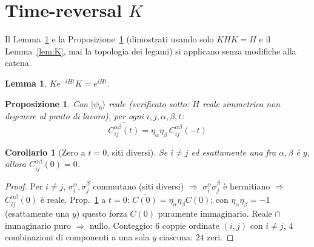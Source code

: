 \documentclass[11pt,a4paper]{article}
\newtheorem{lemma}{Lemma}
\newtheorem{proposizione}{Proposizione}
\newtheorem{corollario}{Corollario}
\begin{document}
\section{Time-reversal \texorpdfstring{$K$}{K}}
\label{sec:K}

Il Lemma~\ref{lem:K-tempo} e la Proposizione~\ref{prop:K-correlatore} (dimostrati usando solo
$KHK=H$ e il Lemma~\ref{lem:K}, mai la topologia dei legami) si applicano senza modifiche alla
catena.

\begin{lemma}
\label{lem:K-tempo}
$Ke^{-iHt}K=e^{iHt}$.
\end{lemma}

\begin{proposizione}
\label{prop:K-correlatore}
Con $|\psi_0\rangle$ reale (verificato sotto: $H$ reale simmetrica non degenere al punto di
lavoro), per ogni $i,j,\alpha,\beta,t$:
\begin{equation}
\boxed{\;\overline{C_{ij}^{\alpha\beta}(t)} = \eta_\alpha\eta_\beta\,C_{ij}^{\alpha\beta}(-t)\;}
\end{equation}
\end{proposizione}

\begin{corollario}[Zero a $t=0$, siti diversi]
\label{cor:zero-t0-diff}
Se $i\neq j$ ed esattamente una fra $\alpha,\beta$ è $y$, allora $C_{ij}^{\alpha\beta}(0)=0$.
\end{corollario}
\begin{proof}
Per $i\neq j$, $\sigma_i^\alpha,\sigma_j^\beta$ commutano (siti diversi) $\Rightarrow$
$\sigma_i^\alpha\sigma_j^\beta$ è hermitiano $\Rightarrow$ $C_{ij}^{\alpha\beta}(0)$ è reale.
Prop.~\ref{prop:K-correlatore} a $t=0$: $\overline{C(0)}=\eta_\alpha\eta_\beta C(0)$; con
$\eta_\alpha\eta_\beta=-1$ (esattamente una $y$) questo forza $C(0)$ puramente immaginario.
Reale $\cap$ immaginario puro $\Rightarrow$ nullo. Conteggio: $6$ coppie ordinate $(i,j)$ con
$i\neq j$, $4$ combinazioni di componenti a una sola $y$ ciascuna: $24$ zeri.
\end{proof}
\end{document}

